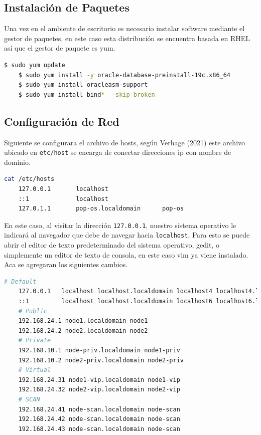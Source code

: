 \documentclass{article}
\begin{document}
\subsection{Instalación de Paquetes}

Una vez en el ambiente de escritorio es necesario instalar software mediante el gestor de paquetes, en este caso esta distribución se encuentra basada en RHEL así que el gestor de paquete es yum.

\begin{lstlisting}[style=mystyle,language=bash]
	$ sudo yum update
	$ sudo yum install -y oracle-database-preinstall-19c.x86_64
	$ sudo yum install oracleasm-support
	$ sudo yum install bind* --skip-broken
\end{lstlisting}

\subsection{Configuración de Red}

Siguiente se configurara el archivo de hosts, según Verhage (2021) este archivo ubicado en \texttt{etc/host} se encarga de conectar direcciones ip con nombre de dominio.

\begin{lstlisting}[style=mystyle,language=bash]
	cat /etc/hosts
	127.0.0.1   	localhost
	::1         	localhost
	127.0.1.1   	pop-os.localdomain  	pop-os
\end{lstlisting}

En este caso, al visitar la dirección \texttt{127.0.0.1}, nuestro sistema operativo le indicará al navegador que debe de navegar hacia \texttt{localhost}. Para esto se puede abrir el editor de texto predeterminado del sistema operativo, gedit, o simplemente un editor de texto de consola, en este caso vim ya viene instalado. Aca se agregaran los siguientes cambios.

\begin{lstlisting}[style=mystyle,language=bash]
	# Default
	127.0.0.1   localhost localhost.localdomain localhost4 localhost4.localdomain4
	::1     	localhost localhost.localdomain localhost6 localhost6.localdomain6
	# Public
	192.168.24.1 node1.localdomain node1
	192.168.24.2 node2.localdomain node2
	# Private
	192.168.10.1 node-priv.localdomain node1-priv
	192.168.10.2 node2-priv.localdomain node2-priv
	# Virtual
	192.168.24.31 node1-vip.localdomain node1-vip
	192.168.24.32 node2-vip.localdomain node2-vip
	# SCAN
	192.168.24.41 node-scan.localdomain node-scan
	192.168.24.42 node-scan.localdomain node-scan
	192.168.24.43 node-scan.localdomain node-scan
\end{lstlisting}
\end{document}
